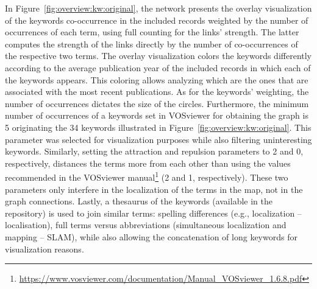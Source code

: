In Figure~\ref{fig:overview:kw:original}, the network presents the overlay visualization of the keywords co-occurrence in the included records weighted by the number of occurrences of each term, using full counting for the links' strength. The latter computes the strength of the links directly by the number of co-occurrences of the respective two terms.
The overlay visualization colors the keywords differently according to the average publication year of the included records in which each of the keywords appears. This coloring allows analyzing which are the ones that are associated with the most recent publications.
As for the keywords' weighting, the number of occurrences dictates the size of the circles.
Furthermore, the minimum number of occurrences of a keywords set in VOSviewer for obtaining the graph is 5 originating the 34 keywords illustrated in Figure~\ref{fig:overview:kw:original}. This parameter was selected for visualization purposes while also filtering uninteresting keywords.
Similarly, setting the attraction and repulsion parameters to 2 and 0, respectively, distances the terms more from each other than using the values recommended in the VOSviewer manual\footnote{\url{https://www.vosviewer.com/documentation/Manual_VOSviewer_1.6.8.pdf}} (2 and 1, respectively). These two parameters only interfere in the localization of the terms in the map, not in the graph connections.
Lastly, a thesaurus of the keywords (available in the repository) is used to join similar terms: spelling differences (e.g., localization -- localisation), full terms versus abbreviations (simultaneous localization and mapping -- SLAM), while also allowing the concatenation of long keywords for visualization reasons.


